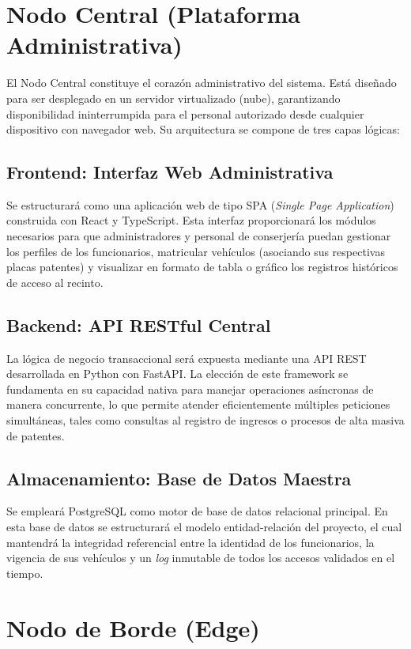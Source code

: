 \section{Nodo Central (Plataforma Administrativa)}

El Nodo Central constituye el corazón administrativo del sistema. Está diseñado para ser desplegado en un servidor virtualizado (nube), garantizando disponibilidad ininterrumpida para el personal autorizado desde cualquier dispositivo con navegador web. Su arquitectura se compone de tres capas lógicas:

\subsection{Frontend: Interfaz Web Administrativa}
Se estructurará como una aplicación web de tipo SPA (\textit{Single Page Application}) construida con React y TypeScript. Esta interfaz proporcionará los módulos necesarios para que administradores y personal de conserjería puedan gestionar los perfiles de los funcionarios, matricular vehículos (asociando sus respectivas placas patentes) y visualizar en formato de tabla o gráfico los registros históricos de acceso al recinto.

\subsection{Backend: API RESTful Central}
La lógica de negocio transaccional será expuesta mediante una API REST desarrollada en Python con FastAPI. La elección de este framework se fundamenta en su capacidad nativa para manejar operaciones asíncronas de manera concurrente, lo que permite atender eficientemente múltiples peticiones simultáneas, tales como consultas al registro de ingresos o procesos de alta masiva de patentes.

\subsection{Almacenamiento: Base de Datos Maestra}
Se empleará PostgreSQL como motor de base de datos relacional principal. En esta base de datos se estructurará el modelo entidad-relación del proyecto, el cual mantendrá la integridad referencial entre la identidad de los funcionarios, la vigencia de sus vehículos y un \textit{log} inmutable de todos los accesos validados en el tiempo.

\section{Nodo de Borde (Edge)}

